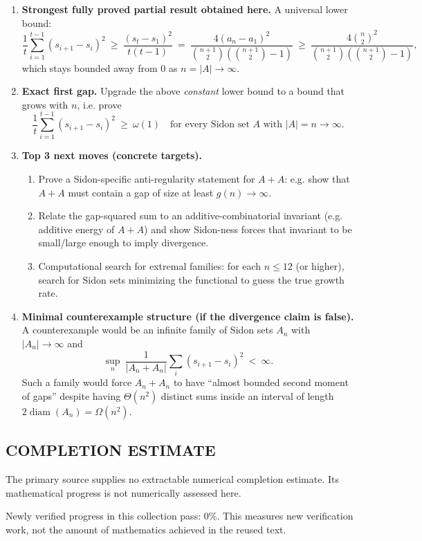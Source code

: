 \begin{enumerate}
\item[(i)] \textbf{Strongest fully proved partial result obtained here.}
A universal lower bound:
\[
\frac{1}{t}\sum_{i=1}^{t-1}(s_{i+1}-s_i)^2\ \ge\ \frac{(s_t-s_1)^2}{t(t-1)}\ =\ \frac{4(a_n-a_1)^2}{\binom{n+1}{2}(\binom{n+1}{2}-1)}\ \ge\ \frac{4\binom{n}{2}^2}{\binom{n+1}{2}(\binom{n+1}{2}-1)},
\]
which stays bounded away from $0$ as $n=|A|\to\infty$.

\item[(ii)] \textbf{Exact first gap.}
Upgrade the above \emph{constant} lower bound to a bound that grows with $n$, i.e. prove
\[
\frac{1}{t}\sum_{i=1}^{t-1}(s_{i+1}-s_i)^2\ \ge\ \omega(1)
\quad\text{for every Sidon set }A\text{ with }|A|=n\to\infty.
\]

\item[(iii)] \textbf{Top 3 next moves (concrete targets).}
\begin{enumerate}
\item Prove a Sidon-specific anti-regularity statement for $A+A$: e.g. show that $A+A$ must contain a gap of size at least $g(n)\to\infty$.
\item Relate the gap-squared sum to an additive-combinatorial invariant (e.g. additive energy of $A+A$) and show Sidon-ness forces that invariant to be small/large enough to imply divergence.
\item Computational search for extremal families: for each $n\le 12$ (or higher), search for Sidon sets minimizing the functional to guess the true growth rate.
\end{enumerate}

\item[(iv)] \textbf{Minimal counterexample structure (if the divergence claim is false).}
A counterexample would be an infinite family of Sidon sets $A_n$ with $|A_n|\to\infty$ and
\[
\sup_n\ \frac{1}{|A_n+A_n|}\sum_{i}(s_{i+1}-s_i)^2\ <\ \infty.
\]
Such a family would force $A_n+A_n$ to have ``almost bounded second moment of gaps'' despite having $\Theta(n^2)$ distinct sums inside an interval of length $2\operatorname{diam}(A_n)=\Omega(n^2)$.
\end{enumerate}




\subsection*{COMPLETION ESTIMATE}
The primary source supplies no extractable numerical completion estimate. Its mathematical progress is not numerically assessed here.

Newly verified progress in this collection pass: $0\%$. This measures new verification work, not the amount of mathematics achieved in the reused text.
